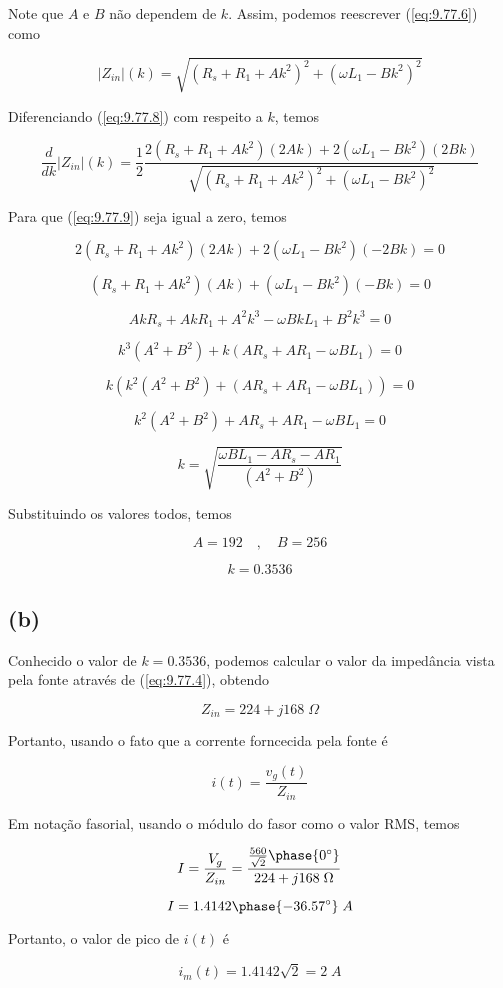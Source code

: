 Note que  \(A\) e \(B\) não dependem de \(k\). Assim, podemos reescrever (\ref{eq:9.77.6}) como

\begin{equation}\label{eq:9.77.8}
    |Z_{in}|(k) = \sqrt{\left(R_s + R_1 + A k^2\right)^2 + \left(\omega L_1 - B k^2\right)^2}
\end{equation}

Diferenciando (\ref{eq:9.77.8}) com respeito a \(k\), temos

\begin{equation}\label{eq:9.77.9}
    \frac{d}{dk}|Z_{in}|(k) = \frac{1}{2}\frac{2(R_s + R_1 + A k^2)(2Ak) + 2(\omega L_1 - B k^2)(2Bk)}{\sqrt{\left(R_s + R_1 + A k^2\right)^2 + \left(\omega L_1 - B k^2\right)^2}}
\end{equation}

Para que (\ref{eq:9.77.9}) seja igual a zero, temos

\[ 2(R_s + R_1 + A k^2)(2Ak) + 2(\omega L_1 - B k^2)(-2Bk) = 0 \]

\[ (R_s + R_1 + A k^2)(Ak) + (\omega L_1 - B k^2)(-Bk) = 0 \]

\[ AkR_s + AkR_1 + A^2k^3 - \omega BkL_1 + B^2k^3 = 0 \]

\[ k^3(A^2+B^2) + k(AR_s + AR_1 - \omega BL_1) = 0 \]

\[ k\left(k^2(A^2+B^2) + (AR_s + AR_1 - \omega BL_1)\right) = 0 \]

\[ k^2(A^2+B^2) + AR_s + AR_1 - \omega BL_1 = 0 \]

\[ k = \sqrt{\frac{\omega BL_1 - AR_s - AR_1 }{(A^2+B^2)}} \]

Substituindo os valores todos, temos

\[ A = 192 \quad , \quad B = 256 \]

\[ \boxed{k = 0.3536} \]

\subsection*{(b)}

Conhecido o valor de \(k = 0.3536\), podemos calcular o valor da impedância vista pela fonte através de (\ref{eq:9.77.4}), obtendo

\[ Z_{in} = 224 + j168 \; \Omega \]

Portanto, usando o fato que a corrente forncecida pela fonte é

\[ i(t) = \frac{v_g(t)}{Z_{in}} \]

Em notação fasorial, usando o módulo do fasor como o valor RMS, temos

\[ I = \frac{V_g}{Z_{in}} = \frac{\frac{560}{\sqrt{2}}\phase{0^{\circ}}}{224 + j168 \; \Omega} \]

\[ I = 1.4142\phase{-36.57^{\circ}} \; A \]

Portanto, o valor de pico de \(i(t)\) é

\[ \boxed{i_m(t) = 1.4142 \sqrt{2} = 2 \; A}  \]
